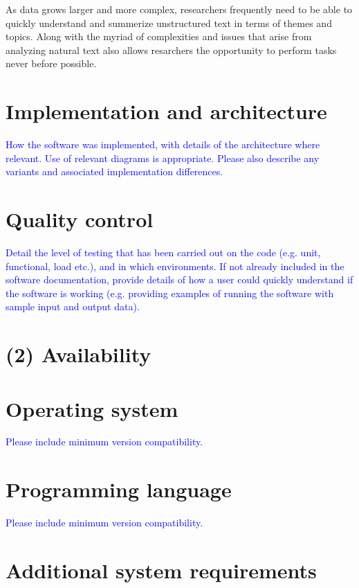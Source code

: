 \documentclass{jors}
\begin{document}
As data grows larger and more complex, researchers frequently need to be able to quickly understand and summerize unstructured text in terms of themes and topics. Along with the myriad of complexities and issues that arise from analyzing natural text also allows resarchers the opportunity to perform tasks never before possible. 




\section*{Implementation and architecture}

\textcolor{blue}{How the software was implemented, with details of the architecture where relevant. Use of relevant diagrams is appropriate. Please also describe any variants and associated implementation differences.}


\section*{Quality control}

\textcolor{blue}{Detail the level of testing that has been carried out on the code (e.g. unit, functional, load etc.), and in which environments. If not already included in the software documentation, provide details of how a user could quickly understand if the software is working (e.g. providing examples of running the software with sample input and output data). }

\section*{(2) Availability}
\vspace{0.5cm}
\section*{Operating system}

\textcolor{blue}{Please include minimum version compatibility.}

\section*{Programming language}

\textcolor{blue}{Please include minimum version compatibility.}

\section*{Additional system requirements}
\end{document}
